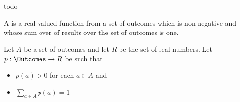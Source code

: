 

todo


A
is a real-valued function
from a set of outcomes which is
non-negative and whose sum over
of results over the set of outcomes
is one.



Let $A$ be a set of outcomes and
let $R$ be the set of real numbers.
Let $p: \Outcomes \to R$ be such that

\begin{itemize}

\item $p(a) > 0$ for each $a \in A$ and
\item $\sum_{a \in A} p(a) = 1$

\end{itemize}

